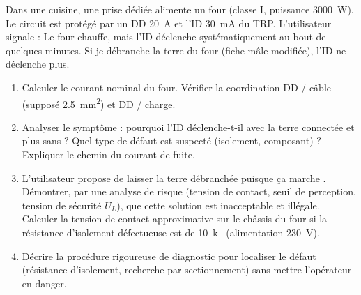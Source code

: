\documentclass[11pt]{article}
\begin{document}
\begin{exercice}
Dans une cuisine, une prise dédiée alimente un four (classe I, puissance \SI{3000}{W}). Le circuit est protégé par un DD \SI{20}{A} et l'ID \SI{30}{mA} du TRP. L'utilisateur signale : \og Le four chauffe, mais l'ID déclenche systématiquement au bout de quelques minutes. Si je débranche la terre du four (fiche mâle modifiée), l'ID ne déclenche plus. \fg
\begin{enumerate}
    \item Calculer le courant nominal du four. Vérifier la coordination DD / câble (supposé \SI{2,5}{mm^2}) et DD / charge.
    \item Analyser le symptôme : pourquoi l'ID déclenche-t-il avec la terre connectée et plus sans ? Quel type de défaut est suspecté (isolement, composant) ? Expliquer le chemin du courant de fuite.
    \item L'utilisateur propose de laisser la terre débranchée \og puisque ça marche \fg. Démontrer, par une analyse de risque (tension de contact, seuil de perception, tension de sécurité $U_L$), que cette solution est inacceptable et illégale. Calculer la tension de contact approximative sur le châssis du four si la résistance d'isolement défectueuse est de \SI{10}{k\Omega} (alimentation \SI{230}{V}).
    \item Décrire la procédure rigoureuse de diagnostic pour localiser le défaut (résistance d'isolement, recherche par sectionnement) sans mettre l'opérateur en danger.
\end{enumerate}
\end{exercice}
\end{document}
